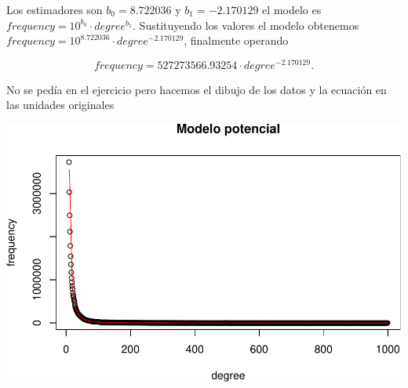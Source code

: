 \documentclass[
]{article}
\newenvironment{Shaded}{\begin{snugshade}}{\end{snugshade}}
\newcommand{\ControlFlowTok}[1]{\textcolor[rgb]{0.13,0.29,0.53}{\textbf{#1}}}
\newcommand{\DataTypeTok}[1]{\textcolor[rgb]{0.13,0.29,0.53}{#1}}
\newcommand{\DecValTok}[1]{\textcolor[rgb]{0.00,0.00,0.81}{#1}}
\newcommand{\FloatTok}[1]{\textcolor[rgb]{0.00,0.00,0.81}{#1}}
\newcommand{\KeywordTok}[1]{\textcolor[rgb]{0.13,0.29,0.53}{\textbf{#1}}}
\newcommand{\NormalTok}[1]{#1}
\newcommand{\OperatorTok}[1]{\textcolor[rgb]{0.81,0.36,0.00}{\textbf{#1}}}
\newcommand{\OtherTok}[1]{\textcolor[rgb]{0.56,0.35,0.01}{#1}}
\newcommand{\StringTok}[1]{\textcolor[rgb]{0.31,0.60,0.02}{#1}}
\begin{document}
Los estimadores son \(b_0=8.722036\) y \(b_1=-2.170129\) el modelo es
\(frequency=10^{b_0}\cdot degree^{b_1}\). Sustituyendo los valores el
modelo obtenemos \(frequency=10^{8.722036}\cdot degree^{-2.170129}\),
finalmente operando

\[frequency=527273566.93254\cdot degree^{-2.170129}.\]

No se pedía en el ejercicio pero hacemos el dibujo de los datos y la
ecuación en las unidades originales

\begin{Shaded}
\end{Shaded}

\includegraphics{taller_problemas_resueltos_extra_1_files/figure-latex/unnamed-chunk-58-1.pdf}
\end{document}

